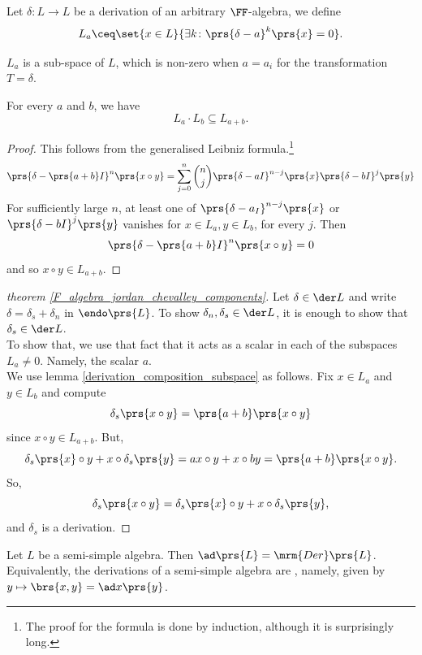 \documentclass[10pt,a4paper,twoside,openany,hidelinks]{book}
\begin{document}
\begin{definition}
Let $\delta \colon L \to L$ be a derivation of an arbitrary $\FF$-algebra, we define
\[L_a \ceq \set{x \in L}{\exists k \colon \prs{\delta - a}^k\prs{x} = 0}\text{.}\]
\end{definition}
\begin{remark}
$L_a$ is a sub-space of $L$, which is non-zero when $a = a_i$ for the transformation $T = \delta$.
\end{remark}
\begin{lemma} \label{derivation_composition_subspace}
For every $a$ and $b$, we have
\[L_a \cdot L_b \subseteq L_{a+b} \text{.}\]
\end{lemma}
\begin{proof}
This follows from the generalised Leibniz formula.\footnote{The proof for the formula is done by induction, although it is surprisingly long.}
\[\prs{\delta - \prs{a+b}I}^n\prs{x \circ y} = \sum_{j=0}^n \binom{n}{j} \prs{\delta - aI}^{n-j}\prs{x}\prs{\delta - bI}^j\prs{y}\]
For sufficiently large $n$, at least one of $\prs{\delta - a_I}^{n-j}\prs{x}$ or $\prs{\delta - bI}^j \prs{y}$ vanishes for $x \in L_a, y \in L_b$, for every $j$. Then
\[\prs{\delta - \prs{a+b}I}^n \prs{x \circ y} = 0\]
and so $x \circ y \in L_{a+b}$.
\end{proof}
\begin{proof}[theorem \ref{F_algebra_jordan_chevalley_components}]
Let $\delta \in \der L$ and write $\delta = \delta_s + \delta_n$ in $\endo\prs{L}$.
To show $\delta_n, \delta_s \in \der L$, it is enough to show that $\delta_s \in \der L$.\\
To show that, we use that fact that it acts as a scalar in each of the subspaces $L_{a} \neq 0$. Namely, the scalar $a$.\\
We use lemma \ref{derivation_composition_subspace} as follows.
Fix $x \in L_a$ and $y \in L_b$ and compute
\[\delta_s\prs{x \circ y} = \prs{a+b}\prs{x \circ y}\]
since $x\circ y \in L_{a+b}$.
But, \[\delta_s\prs{x} \circ y + x \circ \delta_s\prs{y} = ax \circ y + x \circ by = \prs{a+b}\prs{x \circ y}\text{.}\]
So,
\[\delta_s\prs{x \circ y} = \delta_s\prs{x} \circ y + x \circ \delta_s\prs{y} \text{,}\]
and $\delta_s$ is a derivation.
\end{proof}

\begin{theorem} \label{inner_derivations_theorem}
Let $L$ be a semi-simple algebra. Then $\ad \prs{L} = \mrm{Der}\prs{L}$.\\
Equivalently, the derivations of a semi-simple algebra are , namely, given by $y \mapsto \brs{x,y} = \ad x \prs{y}$. 
\end{theorem}
\end{document}

